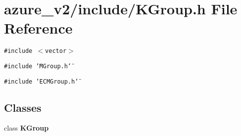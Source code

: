 \section{azure\_\-v2/include/KGroup.h File Reference}
\label{KGroup_8h}
{\tt \#include $<$vector$>$}\par
{\tt \#include \char`\"{}MGroup.h\char`\"{}}\par
{\tt \#include \char`\"{}ECMGroup.h\char`\"{}}\par
\subsection*{Classes}
\begin{CompactItemize}
\item 
class \bf{KGroup}
\end{CompactItemize}
